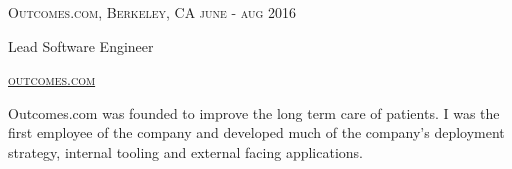 
\raggedright

\textsc{\small{
	Outcomes.com, Berkeley, CA
   	\hfill	
   	{\raggedleft june - aug 2016}
}}
  
{\large Lead Software Engineer}

\textsc{\small\href{http://www.outcomes.com}{outcomes.com}}

Outcomes.com was founded to improve the long term care of patients. I was the first employee of the company and developed much of the company's deployment strategy, internal tooling and external facing applications. 
